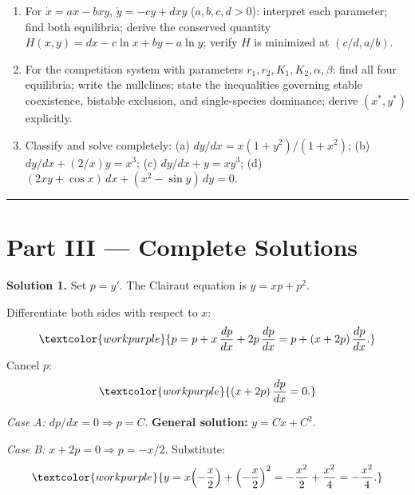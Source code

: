 \begin{enumerate}[leftmargin=2em, itemsep=8pt]
    \item For $\dot{x} = ax - bxy$, $\dot{y} = -cy + dxy$ ($a,b,c,d > 0$):
          interpret each parameter; find both equilibria; derive the conserved
          quantity $H(x,y) = dx - c\ln x + by - a\ln y$; verify $H$ is
          minimized at $(c/d, a/b)$.

    \item For the competition system with parameters $r_1, r_2, K_1, K_2,
          \alpha, \beta$: find all four equilibria; write the nullclines;
          state the inequalities governing stable coexistence, bistable
          exclusion, and single-species dominance; derive $(x^*, y^*)$ explicitly.

    \item Classify and solve completely:
          (a) $dy/dx = x(1+y^2)/(1+x^2)$;\;
          (b) $dy/dx + (2/x)y = x^3$;\;
          (c) $dy/dx + y = xy^3$;\;
          (d) $(2xy + \cos x)\,dx + (x^2 - \sin y)\,dy = 0$.

\end{enumerate}

\vspace{0.4em}
\hrule
\vspace{0.6em}

\clearpage
{}
{}
\section*{Part III --- Complete Solutions}

\noindent\textbf{Solution 1.}\quad
Set $p = y'$. The Clairaut equation is $y = xp + p^2$.

Differentiate both sides with respect to $x$:
\[
  \textcolor{workpurple}{p = p + x\,\frac{dp}{dx} + 2p\,\frac{dp}{dx}
  = p + (x + 2p)\,\frac{dp}{dx}.}
\]
Cancel $p$:
\[
  \textcolor{workpurple}{(x + 2p)\,\frac{dp}{dx} = 0.}
\]

\textit{Case A:} $dp/dx = 0 \Rightarrow p = C$.
\textbf{General solution:} $y = Cx + C^2$.

\textit{Case B:} $x + 2p = 0 \Rightarrow p = -x/2$. Substitute:
\[
  \textcolor{workpurple}{y = x\!\left(-\frac{x}{2}\right)
  + \left(-\frac{x}{2}\right)^2
  = -\frac{x^2}{2} + \frac{x^2}{4} = -\frac{x^2}{4}.}
\]

